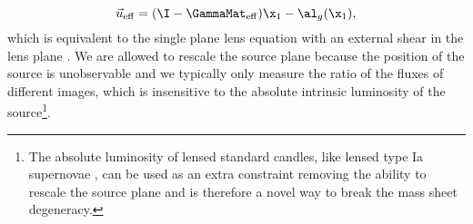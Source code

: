 \begin{equation}
\vec{u}_{\rm eff} = (\I - \GammaMat_{\rm eff}) \x_1 - \al_g(\x_1),
\end{equation}
which is equivalent to the single plane lens equation with an external shear in the lens plane \citep[see also ][]{Schneider97}. We are allowed to rescale the source plane because the position of the source is unobservable and we typically only measure the ratio of the fluxes of different images, which is insensitive to the absolute intrinsic luminosity of the source\footnote{The absolute luminosity of lensed standard candles, like lensed type Ia supernovae \citep{Patel14, Kolatt98}, can be used as an extra constraint removing the ability to rescale the source plane and is therefore a novel way to break the mass sheet degeneracy.}.
  
  